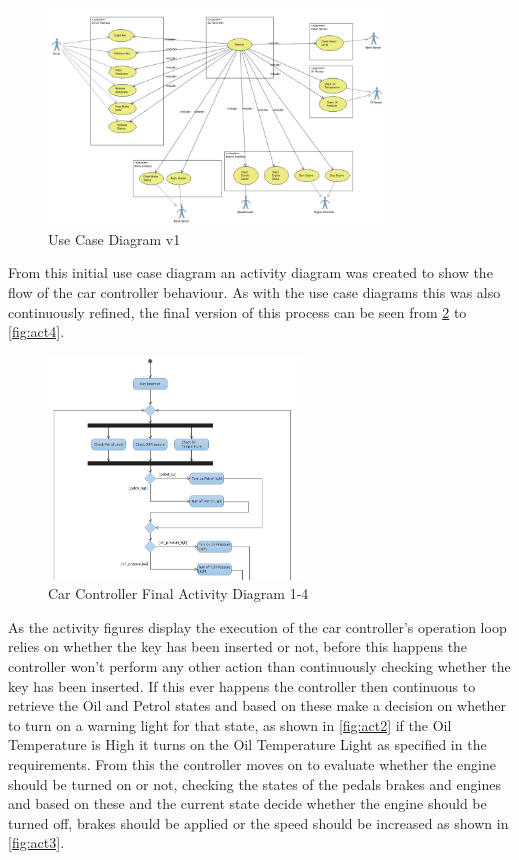 \documentclass[12pt]{article}
\begin{document}
	\begin{figure}
			\includegraphics[width=0.8\textwidth]{use_case_diagram_v1}
			\caption{Use Case Diagram v1}
			\label{fig:use1}
	\end{figure}

From this initial use case diagram an activity diagram was created to show the flow of the car controller behaviour. As with the use case diagrams this was also continuously refined, the final version of this process can be seen from \ref{fig:act1} to \ref{fig:act4}.

\begin{figure}[H]
	\centering
	\includegraphics[width=0.6\textwidth]{activity_diagram_v1}
	\caption{Car Controller Final Activity Diagram 1-4}
	\label{fig:act1}
\end{figure}

As the activity figures display the execution of the car controller’s operation loop relies on whether the key has been inserted or not, before this happens the controller won’t perform any other action than continuously checking whether the key has been inserted. If this ever happens the controller then continuous to retrieve the Oil and Petrol states and based on these make a decision on whether to turn on a warning light for that state, as shown in \ref{fig:act2} if the Oil Temperature is High it turns on the Oil Temperature Light as specified in the requirements. From this the controller moves on to evaluate whether the engine should be turned on or not, checking the states of the pedals brakes and engines and based on these and the current state decide whether the engine should be turned off, brakes should be applied or the speed should be increased as shown in \ref{fig:act3}.
\end{document}
